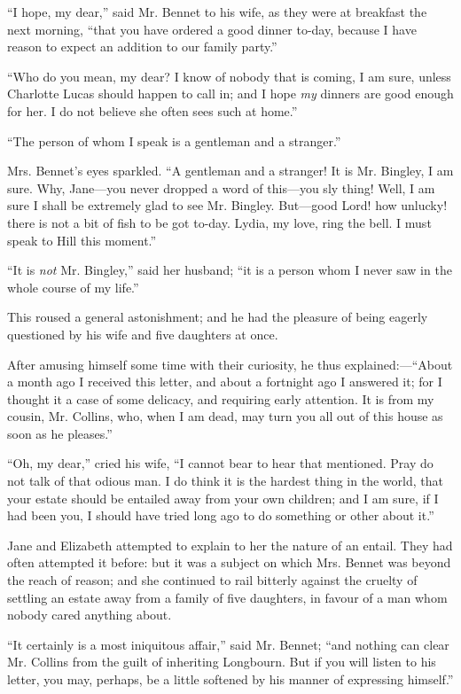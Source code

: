 ``I hope, my dear,'' said Mr. Bennet to his wife, as they were at breakfast the next morning, ``that you have ordered a good dinner to-day, because I have reason to expect an addition to our family party.''

``Who do you mean, my dear? I know of nobody that is coming, I am sure, unless Charlotte Lucas should happen to call in; and I hope \textit{my} dinners are good enough for her. I do not believe she often sees such at home.''

``The person of whom I speak is a gentleman and a stranger.''

Mrs. Bennet's eyes sparkled. ``A gentleman and a stranger! It is Mr. Bingley, I am sure. Why, Jane---you never dropped a word of this---you sly thing! Well, I am sure I shall be extremely glad to see Mr. Bingley. But---good Lord! how unlucky! there is not a bit of fish to be got to-day. Lydia, my love, ring the bell. I must speak to Hill this moment.''

``It is \textit{not} Mr. Bingley,'' said her husband; ``it is a person whom I never saw in the whole course of my life.''

This roused a general astonishment; and he had the pleasure of being eagerly questioned by his wife and five daughters at once.

After amusing himself some time with their curiosity, he thus explained:---``About a month ago I received this letter, and about a fortnight ago I answered it; for I thought it a case of some delicacy, and requiring early attention. It is from my cousin, Mr. Collins, who, when I am dead, may turn you all out of this house as soon as he pleases.''

``Oh, my dear,'' cried his wife, ``I cannot bear to hear that mentioned. Pray do not talk of that odious man. I do think it is the hardest thing in the world, that your estate should be entailed away from your own children; and I am sure, if I had been you, I should have tried long ago to do something or other about it.''

Jane and Elizabeth attempted to explain to her the nature of an entail. They had often attempted it before: but it was a subject on which Mrs. Bennet was beyond the reach of reason; and she continued to rail bitterly against the cruelty of settling an estate away from a family of five daughters, in favour of a man whom nobody cared anything about.

``It certainly is a most iniquitous affair,'' said Mr. Bennet; ``and nothing can clear Mr. Collins from the guilt of inheriting Longbourn. But if you will listen to his letter, you may, perhaps, be a little softened by his manner of expressing himself.''

